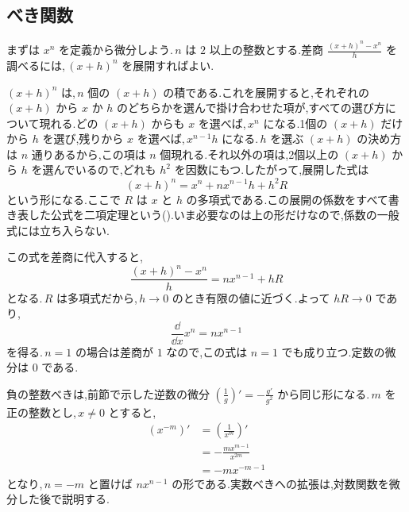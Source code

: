\subsection{べき関数}
まずは $x^n$ を定義から微分しよう.\,$n$ は $2$ 以上の整数とする.差商 $\frac{(x+h)^n-x^n}{h}$ を調べるには,\,$(x+h)^n$ を展開すればよい.

$(x+h)^n$ は,\,$n$ 個の $(x+h)$ の積である.これを展開すると,それぞれの $(x+h)$ から $x$ か $h$ のどちらかを選んで掛け合わせた項が,すべての選び方について現れる.どの $(x+h)$ からも $x$ を選べば,\,$x^n$ になる.1個の $(x+h)$ だけから $h$ を選び,残りから $x$ を選べば,\,$x^{n-1}h$ になる.\,$h$ を選ぶ $(x+h)$ の決め方は $n$ 通りあるから,この項は $n$ 個現れる.それ以外の項は,2個以上の $(x+h)$ から $h$ を選んでいるので,どれも $h^2$ を因数にもつ.したがって,展開した式は
\[
 (x+h)^n=x^n+nx^{n-1}h+h^2R
\]
という形になる.ここで $R$ は $x$ と $h$ の多項式である.この展開の係数をすべて書き表した公式を二項定理という().いま必要なのは上の形だけなので,係数の一般式には立ち入らない.

この式を差商に代入すると,
\[
 \frac{(x+h)^n-x^n}{h}
 =nx^{n-1}+hR
\]
となる.\,$R$ は多項式だから,\,$h\to0$ のとき有限の値に近づく.よって $hR\to0$ であり,
\[
 \frac{\dd}{\dd x}x^n=nx^{n-1}
\]
を得る.\,$n=1$ の場合は差商が $1$ なので,この式は $n=1$ でも成り立つ.定数の微分は $0$ である.

負の整数べきは,前節で示した逆数の微分 $\left(\frac1g\right)'=-\frac{g'}{g^2}$ から同じ形になる.\,$m$ を正の整数とし,\,$x\ne0$ とすると,
\begin{align*}
 (x^{-m})'&=\left(\frac1{x^m}\right)'\\
 &=-\frac{mx^{m-1}}{x^{2m}}\\
 &=-mx^{-m-1}
\end{align*}
となり,\,$n=-m$ と置けば $nx^{n-1}$ の形である.実数べきへの拡張は,対数関数を微分した後で説明する.
